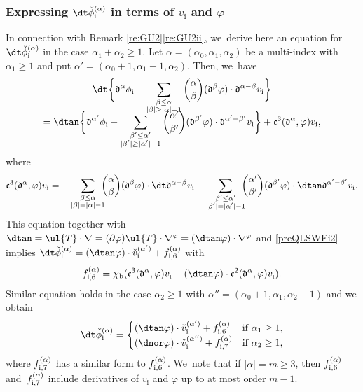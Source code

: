 \subsubsection{Expressing $\dt \check{\phi}_\mathrm{i}^{(\alpha)}$ in terms of $v_\mathrm{i}$ and $\varphi$}\label{sectexprdtphi}
In connection with Remark \ref{re:GU2}\eqref{re:GU2ii}, we~derive here an equation for $\dt\check{\phi}_\mathrm{i}^{(\alpha)}$ in the case $\alpha_1+\alpha_2\geq1$.
Let $\alpha=(\alpha_0,\alpha_1,\alpha_2)$ be a multi-index with $\alpha_1\geq1$ and put $\alpha'=(\alpha_0+1,\alpha_1-1,\alpha_2)$.
Then, we~have
\begin{multline*}
 \dt\biggl\{ \mathfrak{d}^{\alpha}\phi_\mathrm{i}
- \sum_{\substack{\beta\leq\alpha\\ |\beta|\geq|\alpha|-1}} \binom{\alpha}{\beta} (\mathfrak{d}^{\beta}\varphi)\cdot\mathfrak{d}^{\alpha-\beta}v_\mathrm{i} \biggr\} \\[-8pt]
= \dtan\biggl\{ \mathfrak{d}^{\alpha'}\phi_\mathrm{i}
- \sum_{\substack{\beta'\leq\alpha'\\ |\beta'|\geq|\alpha'|-1}} \binom{\alpha'}{\beta'} (\mathfrak{d}^{\beta'}\varphi)\cdot\mathfrak{d}^{\alpha'-\beta'}v_\mathrm{i} \biggr\}
+ {\mathfrak c}^3(\mathfrak{d}^\alpha,\varphi)v_\mathrm{i},
\end{multline*}
where
\[
{\mathfrak c}^3(\mathfrak{d}^\alpha,\varphi)v_\mathrm{i}
= - \sum_{\substack{\beta\leq\alpha\\ |\beta|=|\alpha|-1}}\hspace*{-2mm} \binom{\alpha}{\beta}(\mathfrak{d}^\beta\varphi)\cdot\dt\mathfrak{d}^{\alpha-\beta}v_\mathrm{i}
+ \sum_{\substack{\beta'\leq\alpha'\\ |\beta'|=|\alpha'|-1}} \hspace*{-2mm}\binom{\alpha'}{\beta'} (\mathfrak{d}^{\beta'}\varphi)\cdot\dtan\mathfrak{d}^{\alpha'-\beta'}v_\mathrm{i}.
\]
This equation together with $\dtan=\ul{T}\cdot\nabla=(\partial\varphi)\ul{T}\cdot\nabla^\varphi=(\dtan\varphi)\cdot\nabla^\varphi$ and \eqref{preQLSWEi2} implies
$\dt\check{\phi}_\mathrm{i}^{(\alpha)} = (\dtan\varphi)\cdot\check{v}_\mathrm{i}^{(\alpha')} + f_{{\rm i},6}^{(\alpha)}$ with
\[
f_{{\rm i},6}^{(\alpha)}
= \chi_\mathrm{b}({\mathfrak c}^3(\mathfrak{d}^\alpha,\varphi)v_\mathrm{i} - (\dtan\varphi)\cdot {\mathfrak c}^2(\mathfrak{d}^\alpha,\varphi)v_\mathrm{i}).
\]
Similar equation holds in the case $\alpha_2\geq1$ with $\alpha''=(\alpha_0+1,\alpha_1,\alpha_2-1)$ and we obtain
\begin{equation}\label{Dtphii}
\dt\check{\phi}_\mathrm{i}^{(\alpha)} =
\begin{cases}
(\dtan\varphi)\cdot\check{v}_\mathrm{i}^{(\alpha')} + f_{{\rm i},6}^{(\alpha)} &\mbox{if } \alpha_1\geq1, \\
(\dnor\varphi)\cdot\check{v}_\mathrm{i}^{(\alpha'')} + f_{{\rm i},7}^{(\alpha)} &\mbox{if } \alpha_2\geq1,
\end{cases}
\end{equation}
where $f_{{\rm i},7}^{(\alpha)}$ has a similar form to $f_{{\rm i},6}^{(\alpha)}$. We~note that if $|\alpha|=m\geq3$, then $f_{{\rm i},6}^{(\alpha)}$ and~$f_{{\rm i},7}^{(\alpha)}$ include derivatives of $v_\mathrm{i}$ and $\varphi$
up to at most order $m-1$.

